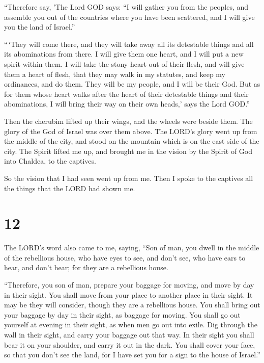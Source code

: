  ``Therefore say, 'The Lord GOD says: ``I will gather you
from the peoples, and assemble you out of the countries where you have
been scattered, and I will give you the land of Israel.''

 ``\,`They will come there, and they will take away all its
detestable things and all its abominations from there.  I
will give them one heart, and I will put a new spirit within them. I
will take the stony heart out of their flesh, and will give them a heart
of flesh,  that they may walk in my statutes, and keep my
ordinances, and do them. They will be my people, and I will be their
God.  But as for them whose heart walks after the heart of
their detestable things and their abominations, I will bring their way
on their own heads,' says the Lord GOD.''

 Then the cherubim lifted up their wings, and the wheels
were beside them. The glory of the God of Israel was over them above.
 The LORD's glory went up from the middle of the city, and
stood on the mountain which is on the east side of the city.
 The Spirit lifted me up, and brought me in the vision by
the Spirit of God into Chaldea, to the captives.

So the vision that I had seen went up from me.  Then I
spoke to the captives all the things that the LORD had shown me.

\hypertarget{section-10}{%
\section{12}\label{section-10}}

 The LORD's word also came to me, saying,  ``Son
of man, you dwell in the middle of the rebellious house, who have eyes
to see, and don't see, who have ears to hear, and don't hear; for they
are a rebellious house.

 ``Therefore, you son of man, prepare your baggage for
moving, and move by day in their sight. You shall move from your place
to another place in their sight. It may be they will consider, though
they are a rebellious house.  You shall bring out your
baggage by day in their sight, as baggage for moving. You shall go out
yourself at evening in their sight, as when men go out into exile.
 Dig through the wall in their sight, and carry your baggage
out that way.  In their sight you shall bear it on your
shoulder, and carry it out in the dark. You shall cover your face, so
that you don't see the land, for I have set you for a sign to the house
of Israel.''

